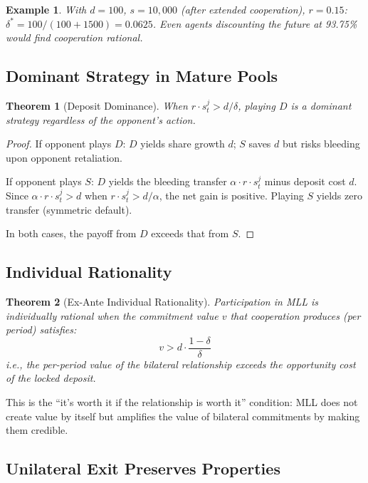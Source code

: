 \documentclass[12pt,a4paper]{article}
\newtheorem{theorem}{Theorem}
\newtheorem{example}{Example}
\begin{document}
\begin{example}
With $d = 100$, $s = 10{,}000$ (after extended cooperation), $r = 0.15$:
$\delta^* = 100 / (100 + 1500) = 0.0625$.
Even agents discounting the future at 93.75\% would find cooperation rational.
\end{example}

\subsection{Dominant Strategy in Mature Pools}

\begin{theorem}[Deposit Dominance]
\label{thm:dominant}
When $r \cdot s_t^j > d / \delta$, playing $D$ is a dominant strategy regardless of the opponent's action.
\end{theorem}

\begin{proof}
If opponent plays $D$: $D$ yields share growth $d$; $S$ saves $d$ but risks bleeding upon opponent retaliation.

If opponent plays $S$: $D$ yields the bleeding transfer $\alpha \cdot r \cdot s_t^j$ minus deposit cost $d$. Since $\alpha \cdot r \cdot s_t^j > d$ when $r \cdot s_t^j > d/\alpha$, the net gain is positive. Playing $S$ yields zero transfer (symmetric default).

In both cases, the payoff from $D$ exceeds that from $S$.
\end{proof}

\subsection{Individual Rationality}

\begin{theorem}[Ex-Ante Individual Rationality]
\label{thm:ir}
Participation in MLL is individually rational when the commitment value $v$ that cooperation produces (per period) satisfies:
\[
v > d \cdot \frac{1-\delta}{\delta}
\]
i.e., the per-period value of the bilateral relationship exceeds the opportunity cost of the locked deposit.
\end{theorem}

This is the ``it's worth it if the relationship is worth it'' condition: MLL does not create value by itself but amplifies the value of bilateral commitments by making them credible.

\subsection{Unilateral Exit Preserves Properties}
\end{document}
